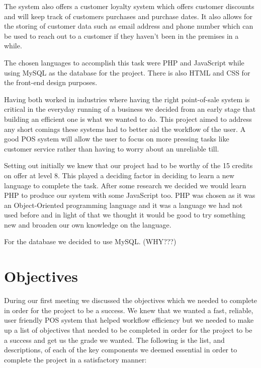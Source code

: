 The system also offers a customer loyalty system which offers customer discounts and will keep track of customers purchases and purchase dates. It also allows for the storing of customer data such as email address and phone number which can be used to reach out to a customer if they haven’t been in the premises in a while.\par
The chosen languages to accomplish this task were PHP and JavaScript while using MySQL as the database for the project. There is also HTML and CSS for the front-end design purposes.\par
Having both worked in industries where having the right point-of-sale system is critical in the everyday running of a business we decided from an early stage that building an efficient one is what we wanted to do. This project aimed to address any short comings these systems had to better aid the workflow of the user. A good POS system will allow the user to focus on more pressing tasks like customer service rather than having to worry about an unreliable till.\par
Setting out initially we knew that our project had to be worthy of the 15 credits on offer at level 8. This played a deciding factor in deciding to learn a new language to complete the task. After some research we decided we would learn PHP to produce our system with some JavaScript too. PHP was chosen as it was an Object-Oriented programming language and it was a language we had not used before and in light of that we thought it would be good to try something new and broaden our own knowledge on the language.\par
For the database we decided to use MySQL. (WHY???)\newpage

\section{Objectives}
During our first meeting we discussed the objectives which we needed to complete in order for the project to be a success. We knew that we wanted a fast, reliable, user friendly POS system that helped workflow efficiency but we needed to make up a list of objectives that needed to be completed in order for the project to be a success and get us the grade we wanted. 
The following is the list, and descriptions, of each of the key components we deemed essential in order to complete the project in a satisfactory manner:

